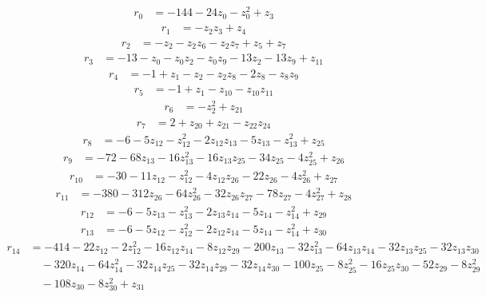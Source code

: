 \begin{align*}
r_{0} &= -144 - 24z_{0} - z_{0}^{2} + z_{3}
\end{align*}
\begin{align*}
r_{1} &= -z_{2}z_{3} + z_{4}
\end{align*}
\begin{align*}
r_{2} &= -z_{2} - z_{2}z_{6} - z_{2}z_{7} + z_{5} + z_{7}
\end{align*}
\begin{align*}
r_{3} &= -13 - z_{0} - z_{0}z_{2} - z_{0}z_{9} - 13z_{2} - 13z_{9} + z_{11}
\end{align*}
\begin{align*}
r_{4} &= -1 + z_{1} - z_{2} - z_{2}z_{8} - 2z_{8} - z_{8}z_{9}
\end{align*}
\begin{align*}
r_{5} &= -1 + z_{1} - z_{10} - z_{10}z_{11}
\end{align*}
\begin{align*}
r_{6} &= -z_{2}^{2} + z_{21}
\end{align*}
\begin{align*}
r_{7} &= 2 + z_{20} + z_{21} - z_{22}z_{24}
\end{align*}
\begin{align*}
r_{8} &= -6 - 5z_{12} - z_{12}^{2} - 2z_{12}z_{13} - 5z_{13} - z_{13}^{2} + z_{25}
\end{align*}
\begin{align*}
r_{9} &= -72 - 68z_{13} - 16z_{13}^{2} - 16z_{13}z_{25} - 34z_{25} - 4z_{25}^{2} + z_{26}
\end{align*}
\begin{align*}
r_{10} &= -30 - 11z_{12} - z_{12}^{2} - 4z_{12}z_{26} - 22z_{26} - 4z_{26}^{2} + z_{27}
\end{align*}
\begin{align*}
r_{11} &= -380 - 312z_{26} - 64z_{26}^{2} - 32z_{26}z_{27} - 78z_{27} - 4z_{27}^{2} + z_{28}
\end{align*}
\begin{align*}
r_{12} &= -6 - 5z_{13} - z_{13}^{2} - 2z_{13}z_{14} - 5z_{14} - z_{14}^{2} + z_{29}
\end{align*}
\begin{align*}
r_{13} &= -6 - 5z_{12} - z_{12}^{2} - 2z_{12}z_{14} - 5z_{14} - z_{14}^{2} + z_{30}
\end{align*}
\begin{align*}
r_{14} &= -414 - 22z_{12} - 2z_{12}^{2} - 16z_{12}z_{14} - 8z_{12}z_{29} - 200z_{13} - 32z_{13}^{2} - 64z_{13}z_{14} - 32z_{13}z_{25} - 32z_{13}z_{30} \\
&\quad  - 320z_{14} - 64z_{14}^{2} - 32z_{14}z_{25} - 32z_{14}z_{29} - 32z_{14}z_{30} - 100z_{25} - 8z_{25}^{2} - 16z_{25}z_{30} - 52z_{29} - 8z_{29}^{2} \\
&\quad  - 108z_{30} - 8z_{30}^{2} + z_{31}
\end{align*}
